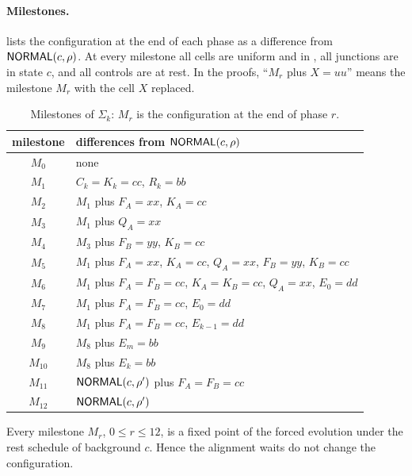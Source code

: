 \paragraph{Milestones.}  lists the configuration at the end of each phase as a
difference from $\textsf{NORMAL}(c,\rho)$. At every milestone all cells are uniform and in \HOLD, all
junctions are in state $c$, and all controls are at rest. In the proofs, ``$M_r$ plus $X=uu$'' means
the milestone $M_r$ with the cell $X$ replaced.

\begin{table}[ht]
\centering\small
\begin{tabular}{cl}\toprule
milestone & differences from $\textsf{NORMAL}(c,\rho)$\\\midrule
$M_0$ & none\\
$M_1$ & $C_k=K_k=cc$, $R_k=bb$\\
$M_2$ & $M_1$ plus $F_A=xx$, $K_A=cc$\\
$M_3$ & $M_1$ plus $Q_A=xx$\\
$M_4$ & $M_3$ plus $F_B=yy$, $K_B=cc$\\
$M_5$ & $M_1$ plus $F_A=xx$, $K_A=cc$, $Q_A=xx$, $F_B=yy$, $K_B=cc$\\
$M_6$ & $M_1$ plus $F_A=F_B=cc$, $K_A=K_B=cc$, $Q_A=xx$, $E_0=dd$\\
$M_7$ & $M_1$ plus $F_A=F_B=cc$, $E_0=dd$\\
$M_8$ & $M_1$ plus $F_A=F_B=cc$, $E_{k-1}=dd$\\
$M_9$ & $M_8$ plus $E_m=bb$\\
$M_{10}$ & $M_8$ plus $E_k=bb$\\
$M_{11}$ & $\textsf{NORMAL}(c,\rho')$ plus $F_A=F_B=cc$\\
$M_{12}$ & $\textsf{NORMAL}(c,\rho')$\\\bottomrule
\end{tabular}
\caption{Milestones of $\Sigma_k$: $M_r$ is the configuration at the end of phase $r$.}
\label{tab:milestones}
\end{table}

\begin{lemma}\label{lem:waits}
Every milestone $M_r$, $0\le r\le 12$, is a fixed point of the forced evolution under the rest
schedule of background $c$. Hence the alignment waits do not change the configuration.
\end{lemma}

